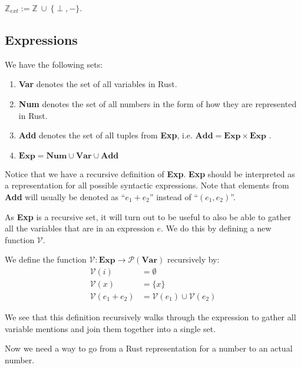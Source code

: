 \begin{definition}
$\mathbb{Z}_{ext} := \mathbb{Z} ~\cup ~ \{\perp, -\}$.
\end{definition}

\subsection*{Expressions}
\begin{definition}
We have the following sets:
\begin{enumerate}[noitemsep, label={\roman*)}]
    \item \textbf{Var} denotes the set of all variables in Rust.
    \item \textbf{Num} denotes the set of all numbers in the form of how they are represented in Rust.
    \item \textbf{Add} denotes the set of all tuples from \textbf{Exp}, i.e. $\textbf{Add} = \textbf{Exp} \times \textbf{Exp}$ . 
    \item $\textbf{Exp} = \textbf{Num} \cup \textbf{Var} \cup \textbf{Add}$
\end{enumerate}
\end{definition}

Notice that we have a recursive definition of \textbf{Exp}. \textbf{Exp} should be interpreted as a representation for all possible syntactic expressions. Note that elements from \textbf{Add} will usually be denoted as ``$e_1 + e_2$'' instead of ``$(e_1, e_2)$''.

As \textbf{Exp} is a recursive set, it will turn out to be useful to also be able to gather all the variables that are in an expression $e$. We do this by defining a new function $\mathcal{V}$.

\begin{definition}
We define the function $\mathcal{V}: \textbf{Exp} \to \mathcal{P}(\textbf{Var})$ recursively by:
\begin{align*}
    \mathcal{V}(i)          &= \emptyset
\\  \mathcal{V}(x)          &= \{ x \}
\\  \mathcal{V}(e_1 + e_2)  &= \mathcal{V}(e_1) \cup \mathcal{V}(e_2)
\end{align*}
\end{definition}

We see that this definition recursively walks through the expression to gather all variable mentions and join them together into a single set. 

Now we need a way to go from a Rust representation for a number to an actual number.

